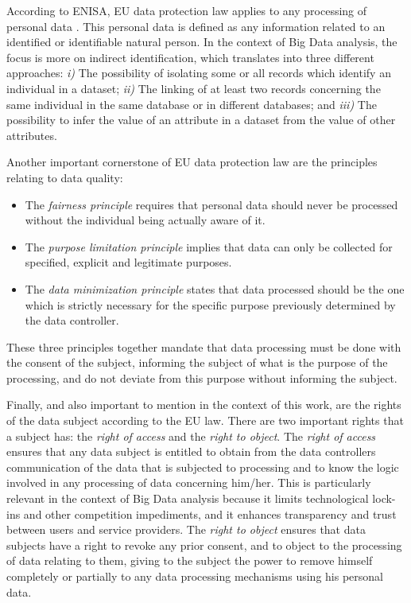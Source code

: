  According to \ac{ENISA}, \ac{EU} data protection law applies to any processing of personal data \cite{DAcquisto2015}. This personal data is defined as any information related to an identified or identifiable natural person. In the context of Big Data analysis, the focus is more on indirect identification, which translates into three different approaches: \emph{i)} The possibility of isolating some or all records which identify an individual in a dataset; \emph{ii)} The linking of at least two records concerning the same individual in the same database or in different databases; and  \emph{iii)} The possibility to infer the value of an attribute in a dataset from the value of other attributes.



Another important cornerstone of \ac{EU} data protection law are the principles relating to data quality:

\begin{itemize}
    \setlength\itemsep{1em}

    \item The \textit{fairness principle} requires that personal data should never be processed without the individual being actually aware of it.

    \item The \textit{purpose limitation principle} implies that data can only be collected for specified, explicit and legitimate purposes.

    \item The \textit{data minimization principle} states that data processed should be the one which is strictly necessary for the specific purpose previously determined by the data controller.
\end{itemize}


These three principles together mandate that data processing must be done with the consent of the subject, informing the subject of what is the purpose of the processing, and do not deviate from this purpose without informing the subject.

Finally, and also important to mention in the context of this work, are the rights of the data subject according to the \ac{EU} law. There are two important rights that a subject has: the \textit{right of access} and the \textit{right to object}.
The \textit{right of access} ensures that any data subject is entitled to obtain from the data controllers communication of the data that is subjected to processing and to know the logic involved in any processing of data concerning him/her.
This is particularly relevant in the context of Big Data analysis because it limits technological lock-ins and other competition impediments, and it enhances transparency and trust between users and service providers.
The \textit{right to object} ensures that data subjects have a right to revoke any prior consent, and to object to the processing of data relating to them, giving to the subject the power to remove himself completely or partially to any data processing mechanisms using his personal data.


